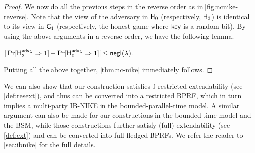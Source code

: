 \begin{proof}
We now do all the previous steps in the reverse order as in \cref{fig:ncnike-reverse}. Note that the view of the adversary in $\mathsf{H}_0$ (respectively, $\mathsf{H}_3$) is identical to its view in $\mathsf{G}_4$ (respectively, the honest game where $\mathsf{key}$ is a random bit). By using the above arguments in a reverse order, we have the following lemma.

\begin{lemma}
\label{lem:ncnike-h}
$
|\Pr[\mathsf{H}_3^{{\mathsf{adv}}_\lambda}\Rightarrow 1]-\Pr[\mathsf{H}_0^{{\mathsf{adv}}_\lambda}\Rightarrow 1]|\leq\mathsf{negl}(\lambda).
$
\end{lemma}

Putting all the above together, \cref{thm:nc-nike} immediately follows.
\end{proof}

 We can also show that our construction satisfies $0$-restricted extendability (see \cref{def:resext}), and thus can be converted into a restricted BPRF, which in turn implies a multi-party IB-NIKE in the bounded-parallel-time model. A similar argument can also be made for our constructions in the bounded-time model and the BSM, while those constructions further satisfy (full) extendability (see \cref{def:ext}) and can be converted into full-fledged BPRFs. We refer the reader to \cref{sec:ibnike} for the full details.

